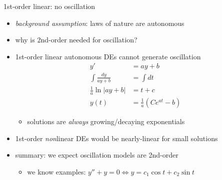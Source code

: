 \documentclass[dvipsnames,colorlinks]{beamer}
\begin{document}
\begin{frame}{1st-order linear: no oscillation}

\begin{itemize}
\item \emph{background assumption}: laws of nature are autonomous
\item why is 2nd-order needed for oscillation?
\item 1st-order linear autonomous DEs cannot generate oscillation \small
\begin{align*}
y' &= a y + b \\
\int \frac{dy}{ay+b} &= \int dt \\
\frac{1}{a} \ln|ay+b| &= t+c \\
y(t) &= \frac{1}{a}\left(C e^{at} - b\right)
\end{align*}

\vspace{-3mm}
    \begin{itemize}
    \item solutions are \emph{always} growing/decaying exponentials
    \end{itemize}
\item 1st-order \emph{non}linear DEs would be nearly-linear for small solutions
\item summary: we expect oscillation models are 2nd-order
    \begin{itemize}
    \item we know examples: \footnotesize $y'' + y = 0 \iff y = c_1 \cos t + c_2 \sin t$
    \end{itemize}
\end{itemize}
\end{frame}
\end{document}
